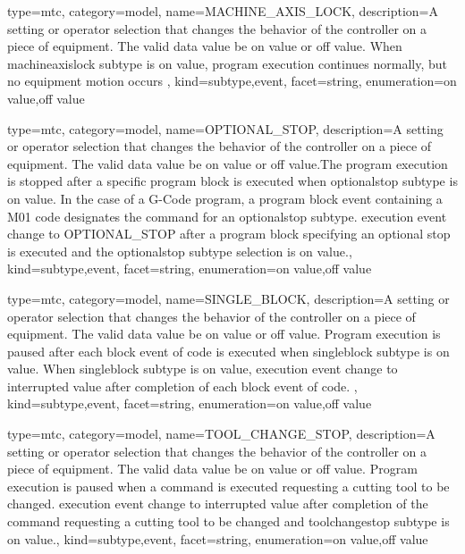 {
  type=mtc,
  category=model,
  name={MACHINE\_AXIS\_LOCK},
  description={A setting or operator selection that changes the behavior of the controller on a piece of equipment.  The \gls{valid data value} \must be \gls{on value} or \gls{off value}. \newline When \gls{machineaxislock subtype} is \gls{on value}, program execution continues normally, but no equipment motion occurs },
  kind={subtype,event},
  facet={\gls{string}},
  enumeration={\gls{on value},\gls{off value}}
}


{
  type=mtc,
  category=model,
  name={OPTIONAL\_STOP},
  description={A setting or operator selection that changes the behavior of the controller on a piece of equipment.  The \gls{valid data value} \must be \gls{on value} or \gls{off value}.The program execution is stopped after a specific program block is executed when \gls{optionalstop subtype} is \gls{on value}.    \newline In the case of a G-Code program, a program \gls{block event} containing a M01 code designates the command for an \gls{optionalstop subtype}. \gls{execution event} \must change to OPTIONAL\_STOP after a program block specifying an optional stop is executed and the \gls{optionalstop subtype} selection is \gls{on value}.},
  kind={subtype,event},
  facet={\gls{string}},
  enumeration={\gls{on value},\gls{off value}}
}


{
  type=mtc,
  category=model,
  name={SINGLE\_BLOCK},
  description={A setting or operator selection that changes the behavior of the controller on a piece of equipment.  The \gls{valid data value} \must be \gls{on value} or \gls{off value}. Program execution is paused after each \gls{block event} of code is executed when \gls{singleblock subtype} is \gls{on value}.   \newline When \gls{singleblock subtype} is \gls{on value}, \gls{execution event} \must change to \gls{interrupted value} after completion of each \gls{block event} of code. },
  kind={subtype,event},
  facet={\gls{string}},
  enumeration={\gls{on value},\gls{off value}}
}


{
  type=mtc,
  category=model,
  name={TOOL\_CHANGE\_STOP},
  description={A setting or operator selection that changes the behavior of the controller on a piece of equipment.  The \gls{valid data value} \must be \gls{on value} or \gls{off value}. Program execution is paused when a command is executed requesting a cutting tool to be changed. \gls{execution event} \must change to \gls{interrupted value} after completion of the command requesting a cutting tool to be changed and \gls{toolchangestop subtype} is \gls{on value}.},
  kind={subtype,event},
  facet={\gls{string}},
  enumeration={\gls{on value},\gls{off value}}
}


